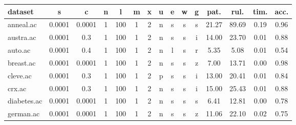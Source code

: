 \begin{table}[htbp]
	\centering
		\begin{tabular}{|l|c|c|c|c|c|c|c|c|c|c||c|c|c|c|}
		\hline
		\textbf{dataset}	& \textbf{s}	& \textbf{c}	& \textbf{n}	& \textbf{l}	& \textbf{m}	& \textbf{x}	& \textbf{u}	& \textbf{e} & \textbf{w} & \textbf{g} & \textbf{pat.}	& \textbf{rul.}	& \textbf{tim.}	& \textbf{acc.}	\\
		\hline
		anneal.ac      & 0.0001   & 0.0001      & 1              & 100                 & 1             & 2        & n             & s      & s        & s        & 21.27          & 89.69          & 0.19           & 0.96           \\
		\hline
		austra.ac      & 0.0001   & 0.3         & 1              & 100                 & 1             & 2        & n             & s      & s        & i        & 14.00          & 23.70          & 0.01           & 0.88           \\
		\hline
		auto.ac        & 0.0001   & 0.4         & 1              & 100                 & 1             & 2        & n             & l      & s        & r        & 5.35           & 5.08           & 0.01           & 0.54           \\
		\hline
		breast.ac      & 0.0001   & 0.0001      & 1              & 100                 & 1             & 2        & n             & s      & s        & z        & 7.00           & 13.71          & 0.00           & 0.98           \\
		\hline
		cleve.ac       & 0.0001   & 0.3         & 1              & 100                 & 1             & 2        & p             & s      & s        & i        & 13.00          & 20.41          & 0.01           & 0.84           \\
		\hline
		crx.ac         & 0.0001   & 0.3         & 1              & 100                 & 1             & 2        & n             & s      & s        & i        & 15.00          & 25.43          & 0.01           & 0.88           \\
		\hline
		diabetes.ac    & 0.0001   & 0.0001      & 1              & 100                 & 1             & 2        & n             & s      & s        & s        & 6.41           & 12.81          & 0.00           & 0.78           \\
		\hline
		german.ac      & 0.0001   & 0.0001      & 1              & 100                 & 1             & 2        & n             & s      & s        & z        & 11.06          & 22.10          & 0.02           & 0.75           \\

\end{tabular}
\end{table}
